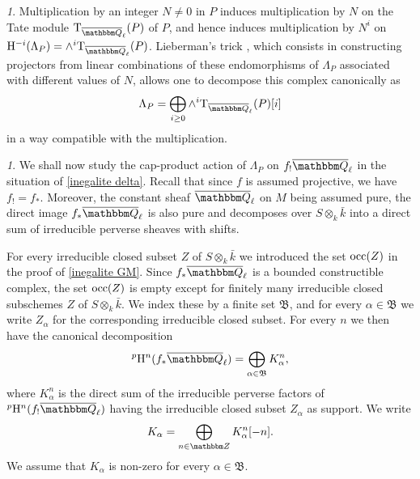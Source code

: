 \documentclass[12pt,english]{smfart}
\numberwithin{equation}{subsection}
\theoremstyle{remark}
\newtheorem{numero}[equation]{}
\newcommand\rmT{{\rm T}}
\newcommand\FrakB{{\mathfrak B}}
\newcommand\ZZ{{\mathbbm Z}}
\newcommand\QQ{{\mathbbm Q}}
\newcommand\rmH{{\rm H}}
\newcommand\Ql{{\overline\QQ_\ell}}
\begin{document}
\begin{numero}\label{decomposition Lieberman}
Multiplication by an integer $N\not=0$ in $P$ induces multiplication by $N$ on the Tate module $\rmT_\Ql(P)$ of $P$, and hence induces multiplication by $N^i$ on $\rmH^{-i}(\Lambda_P)=\wedge^i \rmT_\Ql(P)$. Lieberman's trick \cite[2A11]{Kl}, which consists in constructing projectors from linear combinations of these endomorphisms of $\Lambda_P$ associated with different values of $N$, allows one to decompose this complex canonically as
$$\Lambda_P=\bigoplus_{i\geq 0} \wedge^i \rmT_\Ql(P)[i]$$
in a way compatible with the multiplication.
\end{numero}

\begin{numero}\label{decomposition par supports}
We shall now study the cap-product action of $\Lambda_P$ on $f_!\Ql$ in the situation of \ref{inegalite delta}. Recall that since $f$ is assumed projective, we have $f_!=f_*$. Moreover, the constant sheaf $\Ql$ on $M$ being assumed pure, the direct image $f_*\Ql$ is also pure and decomposes over $S\otimes_k\bar k$ into a direct sum of irreducible perverse sheaves with shifts.

For every irreducible closed subset $Z$ of $S\otimes_k\bar k$ we introduced the set ${\rm occ}(Z)$ in the proof of \ref{inegalite GM}. Since $f_*\Ql$ is a bounded constructible complex, the set ${\rm occ}(Z)$ is empty except for finitely many irreducible closed subschemes $Z$ of $S\otimes_k\bar k$. We index these by a finite set $\FrakB$, and for every $\alpha\in\FrakB$ we write $Z_\alpha$ for the corresponding irreducible closed subset. For every $n$ we then have the canonical decomposition
$${}^p\rmH^n(f_*\Ql)=\bigoplus_{\alpha\in\FrakB} K^n_\alpha,$$
where $K^n_\alpha$ is the direct sum of the irreducible perverse factors of ${}^p\rmH^n(f_!\Ql)$ having the irreducible closed subset $Z_\alpha$ as support. We write
$$K_\alpha=\bigoplus_{n\in\ZZ} K^n_\alpha[-n].$$
We assume that $K_\alpha$ is non-zero for every $\alpha\in\FrakB$.
\end{numero}
\end{document}
